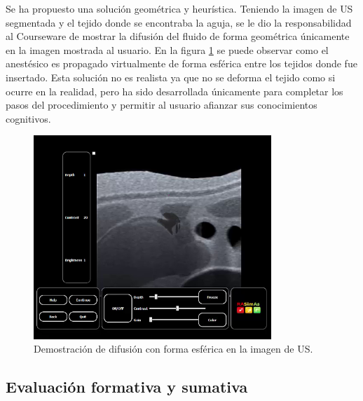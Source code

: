 
Se ha propuesto una solución geométrica y heurística. Teniendo la imagen de \ac{US} segmentada y el tejido donde se encontraba la aguja, se le dio la responsabilidad al \ac{Courseware} de mostrar la difusión del fluido de forma geométrica únicamente en la imagen mostrada al usuario. En la figura \ref{fig:spread2} se puede observar como el anestésico es propagado virtualmente de forma esférica entre los tejidos donde fue insertado. Esta solución no es realista ya que no se deforma el tejido como si ocurre en la realidad, pero ha sido desarrollada únicamente para completar los pasos del procedimiento y permitir al usuario afianzar sus conocimientos cognitivos.

\begin{figure}[ht]
    \centering
    \includegraphics[width=0.8\textwidth]{IMG/difussion.png}
    \caption{Demostración de difusión con forma esférica en la imagen de \acs{US}.}
    \label{fig:spread2}
\end{figure}

 



\subsection{Evaluación formativa y sumativa}
\label{course:feedback}

